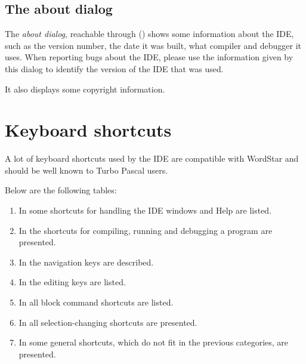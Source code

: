 %
%
\subsection{The about dialog}
\label{se:about}
The {\em about dialog}, reachable through () shows some
information about the IDE, such as the version number, the date it was built,
what compiler and debugger it uses. When reporting bugs about the IDE, please
use the information given by this dialog to identify the version of the IDE
that was used.

It also displays some copyright information.

\section{Keyboard shortcuts}
\label{se:keyshortcuts}
A lot of keyboard shortcuts used by the IDE are compatible with
WordStar and should be well known to Turbo Pascal users.

Below are the following tables:
\begin{enumerate}
\item In  some shortcuts for handling the IDE windows
and Help are listed.
\item In  the shortcuts for compiling, running and
debugging a program are presented.
\item In  the navigation keys are described.
\item In  the editing keys are listed.
\item In  all block command shortcuts are listed.
\item In  all selection-changing shortcuts are
presented.
\item In  some general shortcuts,
which do not fit in the previous categories, are presented.
\end{enumerate}

